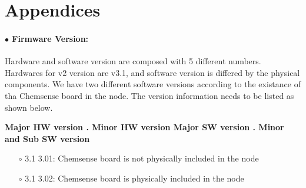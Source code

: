 \newpage
\section{Appendices}

\paragraph{$\bullet$ Firmware Version:}

Hardware and software version are composed with 5 different numbers.
Hardwares for v2 version are v3.1, and software version is differed by the physical components.
We have two different software versions according to the existance of tha Chemsense board in the node.
The version information needs to be listed as shown below.

\textbf{Major HW version . Minor HW version \tab Major SW version . Minor and Sub SW version}

\begin{itemize}
\item[$\circ$] 3.1 3.01: Chemsense board is not physically included in the node
\item[$\circ$] 3.1 3.02: Chemsense board is physically included in the node
\end{itemize}